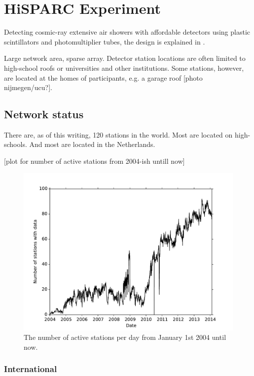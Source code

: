 \chapter{HiSPARC Experiment}
\label{ch:hisparc-experiment}

Detecting cosmic-ray extensive air showers with affordable detectors
using plastic scintillators and photomultiplier tubes, the design is
explained in .

Large network area, sparse array. Detector station locations are often
limited to high-school roofs or universities and other institutions.
Some stations, however, are located at the homes of participants, e.g.
a garage roof [photo nijmegen/ucu?].



\section{Network status}

There are, as of this writing, 120 \hisparc stations in the world. Most
are located on high-schools. And most are located in the Netherlands.

[plot for number of active stations from 2004-ish untill now]


\begin{figure}
    \centering
    \includegraphics[width=0.7\linewidth]{plots/network/number_of_stations_with_data_per_day}
    \caption{ The number of active
             stations per day from January 1st 2004 until now.}
    \label{fig:number_of_stations_with_data_per_day}
\end{figure}


\subsection{International}

